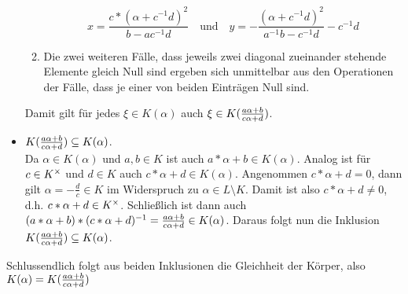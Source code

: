 \begin{exercisePage}
\begin{itemize}[leftmargin=*]
\begin{enumerate}[leftmargin=*, label=(\roman*)]
            \begin{equation*}
                x = \frac{c * (\alpha + c^{-1}d)^2}{b - ac^{-1}d} \quad \text{und} \quad
                y = - \frac{(\alpha + c^{-1}d)^2}{a^{-1}b - c^{-1}d} - c^{-1}d
            \end{equation*}
            \item Die zwei weiteren Fälle, dass jeweils zwei diagonal zueinander stehende Elemente gleich Null sind ergeben sich unmittelbar aus den Operationen der Fälle, dass je einer von beiden Einträgen Null sind.
        \end{enumerate}
        Damit gilt für jedes $\xi \in K(\alpha)$ auch $\xi \in K(\frac{a \alpha + b}{c \alpha + d})$.
        
        \item $K(\frac{a \alpha + b}{c \alpha + d}) \subseteq K(\alpha)$. \\ 
        Da $\alpha \in K(\alpha)$ und $a,b \in K$ ist auch $a * \alpha + b \in K(\alpha)$. Analog ist für $c \in {K}^{\times}$ und $d \in K$ auch $c * \alpha + d \in K(\alpha)$. Angenommen $c * \alpha + d = 0$, dann gilt $\alpha = -\frac{d}{c} \in K$ im Widerspruch zu $\alpha \in L \setminus K$. Damit ist also $c * \alpha + d \neq 0$, d.h. $c * \alpha + d \in {K}^{\times}$. Schließlich ist dann auch $(a * \alpha + b) * (c * \alpha + d)^{-1} = \frac{a \alpha + b}{c \alpha + d} \in K(\alpha)$. Daraus folgt nun die Inklusion $K(\frac{a \alpha + b}{c \alpha + d}) \subseteq K(\alpha)$.
    \end{itemize}
    Schlussendlich folgt aus beiden Inklusionen die Gleichheit der Körper, also $K(\alpha) = K(\frac{a \alpha + b}{c \alpha + d})$
    
    \undef\bruch
    \undef\mymatrix
    


\end{exercisePage}
